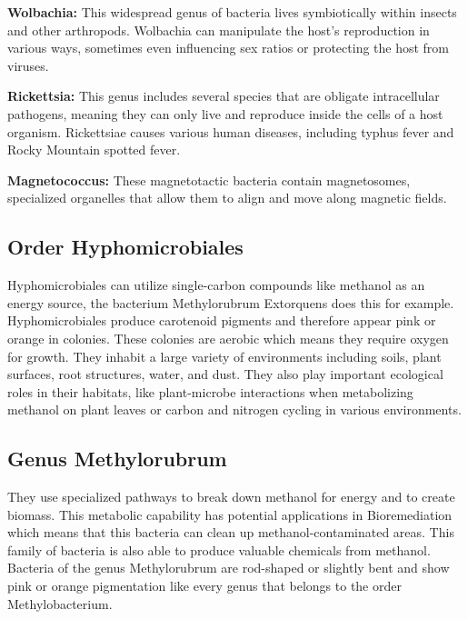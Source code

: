 \textbf{Wolbachia:} This widespread genus of bacteria lives symbiotically within insects and other
arthropods.
Wolbachia can manipulate the host's reproduction in various ways,
sometimes even influencing sex ratios or protecting the host from viruses.

\textbf{Rickettsia:} This genus includes several species that are obligate intracellular pathogens,
meaning they can only live and reproduce inside the cells of a host organism. Rickettsiae
causes various human diseases, including typhus fever and Rocky Mountain spotted fever.

\textbf{Magnetococcus:} These magnetotactic bacteria contain magnetosomes, specialized
organelles that allow them to align and move along magnetic fields.

\subsection{Order Hyphomicrobiales}
Hyphomicrobiales can utilize single-carbon compounds like methanol as an energy
source, the bacterium Methylorubrum Extorquens does this for example.
Hyphomicrobiales produce carotenoid pigments and therefore appear pink or orange in
colonies. These colonies are aerobic which means they require oxygen for growth. They
inhabit a large variety of environments including soils, plant surfaces, root structures,
water, and dust.
They also play important ecological roles in their habitats, like plant-microbe interactions
when metabolizing methanol on plant leaves or carbon and nitrogen cycling in various
environments.

\subsection{Genus Methylorubrum}
They use specialized pathways to break down methanol for energy and to create
biomass. This metabolic capability has potential applications in Bioremediation which
means that this bacteria can clean up methanol-contaminated areas. This family of
bacteria is also able to produce valuable chemicals from methanol.
Bacteria of the genus Methylorubrum are rod-shaped or slightly bent and show pink or
orange pigmentation like every genus that belongs to the order Methylobacterium.

